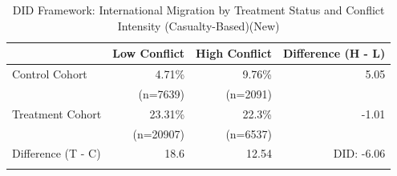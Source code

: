 \begin{table}[!h]
\centering
\caption{\label{tab:tab:did_casualty}DID Framework: International Migration by Treatment Status and Conflict Intensity (Casualty-Based)(New)}
\centering
\fontsize{10}{12}\selectfont
\begin{tabular}[t]{lrrr}
\toprule
 & Low Conflict & High Conflict & Difference (H - L)\\
\midrule
Control Cohort & 4.71\% & 9.76\% & 5.05 \\
 & (n=7639) & (n=2091) & \\
Treatment Cohort & 23.31\% & 22.3\% & -1.01 \\
 & (n=20907) & (n=6537) & \\
Difference (T - C) & 18.6  & 12.54  & DID: -6.06 \\
\addlinespace
 &  &  & \\
\bottomrule
\end{tabular}
\end{table}